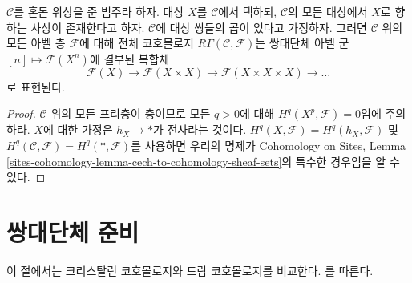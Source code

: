 \begin{lemma}
\label{lemma-category-with-covering}
$\mathcal{C}$를 혼돈 위상을 준 범주라 하자. 대상 $X$를
$\mathcal{C}$에서 택하되, $\mathcal{C}$의 모든 대상에서 $X$로
향하는 사상이 존재한다고 하자.
$\mathcal{C}$에 대상 쌍들의 곱이 있다고 가정하자. 그러면
$\mathcal{C}$ 위의 모든 아벨 층 $\mathcal{F}$에 대해 전체
코호몰로지 $R\Gamma(\mathcal{C}, \mathcal{F})$는 쌍대단체 아벨 군
$[n] \mapsto \mathcal{F}(X^n)$에 결부된 복합체
$$
\mathcal{F}(X) \to \mathcal{F}(X \times X) \to
\mathcal{F}(X \times X \times X) \to \ldots
$$
로 표현된다.
\end{lemma}

\begin{proof}
$\mathcal{C}$ 위의 모든 프리층이 층이므로 모든 $q > 0$에 대해
$H^q(X^p, \mathcal{F}) = 0$임에 주의하라. $X$에 대한 가정은
$h_X \to *$가 전사라는 것이다. $H^q(X, \mathcal{F}) =
H^q(h_X, \mathcal{F})$ 및 $H^q(\mathcal{C}, \mathcal{F}) =
H^q(*, \mathcal{F})$를 사용하면 우리의 명제가 Cohomology on Sites,
Lemma \ref{sites-cohomology-lemma-cech-to-cohomology-sheaf-sets}의
특수한 경우임을 알 수 있다.
\end{proof}









\section{쌍대단체 준비}
\label{section-cohomology}

\noindent
이 절에서는 크리스탈린 코호몰로지와 드람 코호몰로지를 비교한다.
\cite{Bhatt}를 따른다.

